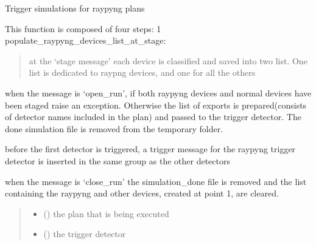 \documentclass[letterpaper,10pt,english]{sphinxmanual}
\begin{document}
\begin{fulllineitems}
\label{\detokenize{API:raypyng_bluesky.preprocessor.trigger_sim}}
\pysigstartsignatures
{}
\pysigstopsignatures
\sphinxAtStartPar
Trigger simulations for raypyng plans

\sphinxAtStartPar
This function is composed of four steps:
1\sphinxhyphen{} populate\_raypyng\_devices\_list\_at\_stage:
\begin{quote}

\sphinxAtStartPar
at the ‘stage message’ each device is classified
and saved into two list. One list is dedicated to
raypng devices, and one for all the others
\end{quote}
\begin{description}
\sphinxAtStartPar
when the message is ‘open\_run’, if both raypyng
devices and normal devices have been staged raise
an exception. Otherwise the list of exports is
prepared(consists of detector names included in the plan)
and passed to the trigger detector.
The done simulation file is removed from the
temporary folder.

\sphinxAtStartPar
before the first detector is triggered, a trigger
message for the raypyng trigger detector is inserted
in the same group as the other detectors

\sphinxAtStartPar
when the message is ‘close\_run’ the simulation\_done
file is removed and the list containing the raypyng and
other devices, created at point 1, are cleared.

\end{description}
\begin{quote}\begin{description}
\begin{itemize}
\item {} 
\sphinxAtStartPar
{} () \textendash{} the plan that is being executed

\item {} 
\sphinxAtStartPar
{} ({\hyperref[\detokenize{API:raypyng_bluesky.detector.RaypyngTriggerDetector}]{}}) \textendash{} the trigger detector


\end{itemize}
\end{description}
\end{quote}
\end{fulllineitems}
\end{document}
